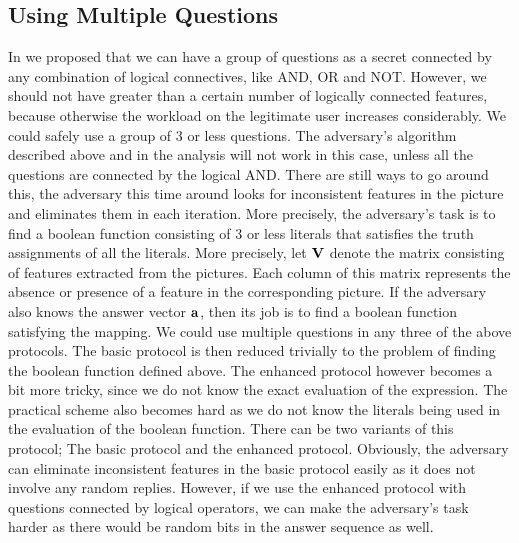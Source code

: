 \documentclass{llncs}
\begin{document}
\subsection{Using Multiple Questions}
In \cite{hassan} we proposed that we can have a group of questions as a secret connected by any combination of logical connectives, like AND, OR and NOT. However, we should not have greater than a certain number of logically connected features, because otherwise the workload on the legitimate user increases considerably. We could safely use a group of 3 or less questions. The adversary's algorithm described above and in the analysis will not work in this case, unless all the questions are connected by the logical AND. There are still ways to go around this, the adversary this time around looks for inconsistent features in the picture and eliminates them in each iteration. More precisely, the adversary's task is to find a boolean function consisting of 3 or less literals that satisfies the truth assignments of all the literals. More precisely, let ${\bf{V}}$ denote the matrix consisting of features extracted from the pictures. Each column of this matrix represents the absence or presence of a feature in the corresponding picture. If the adversary also knows the answer vector ${\bf{a}}$, then its job is to find a boolean function satisfying the mapping. We could use multiple questions in any three of the above protocols. The basic protocol is then reduced trivially to the problem of finding the boolean function defined above. The enhanced protocol however becomes a bit more tricky, since we do not know the exact evaluation of the expression. The practical scheme also becomes hard as we do not know the literals being used in the evaluation of the boolean function. 
There can be two variants of this protocol; The basic protocol and the enhanced protocol. Obviously, the adversary can eliminate inconsistent features in the basic protocol easily as it does not involve any random replies. However, if we use the enhanced protocol with questions connected by logical operators, we can make the adversary's task harder as there would be random bits in the answer sequence as well. 
\end{document}
